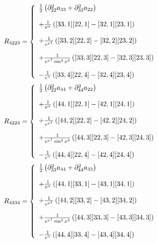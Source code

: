 \begin{align}
R_{3223}&= \left\{\begin{array}{l}
\frac{1}{2}\left(\partial^2_{22} a_{33}+\partial^2_{33} a_{22}\right)\\\\
+ \frac{1}{e^{\alpha}}\left( [33,1] [22,1] -[32,1] [23,1]  \right)\\\\
+ \frac{1}{e^{x^1}}\left( [33,2] [22,2] -[32,2] [23,2]   \right)\\\\
+ \frac{1}{e^{x^1}\sin^2 x^2}\left( [33,3]  [22,3] -[32,3] [23,3]  \right)\\\\
-\frac{1}{e^{\gamma}}\left( [33,4]  [22,4] -[32,4] [23,4]   \right)
\end {array}\right.\\
\end{align}
\begin{align}
R_{4224}&= \left\{\begin{array}{l}
\frac{1}{2}\left(\partial^2_{22} a_{44}+\partial^2_{44} a_{22}\right)\\\\
+ \frac{1}{e^{\alpha}}\left( [44,1] [22,1] -[42,1] [24,1]  \right)\\\\
+ \frac{1}{e^{x^1}}\left( [44,2] [22,2] -[42,2] [24,2]  \right)\\\\
+ \frac{1}{e^{x^1}\sin^2 x^2}\left( [44,3] [22,3] -[42,3] [24,3]  \right)\\\\
-\frac{1}{e^{\gamma}}\left( [44,4] [22,4] -[42,4] [24,4]  \right)
\end {array}\right.\\
\end{align}
\begin{align}
R_{4334}&= \left\{\begin{array}{l}
\frac{1}{2}\left(\partial^2_{33} a_{44}+\partial^2_{44} a_{33}\right)\\\\
+ \frac{1}{e^{\alpha}}\left( [44,1] [33,1] -[43,1] [34,1]  \right)\\\\
+ \frac{1}{e^{x^1}}\left( [44,2] [33,2] -[43,2] [34,2]  \right)\\\\
+ \frac{1}{e^{x^1}\sin^2 x^2}\left( [44,3] [33,3] -[43,3] [34,3]  \right)\\\\
-\frac{1}{e^{\gamma}}\left( [44,4] [33,4] -[43,4] [34,4]  \right)
\end {array}\right.\\
\end{align}
